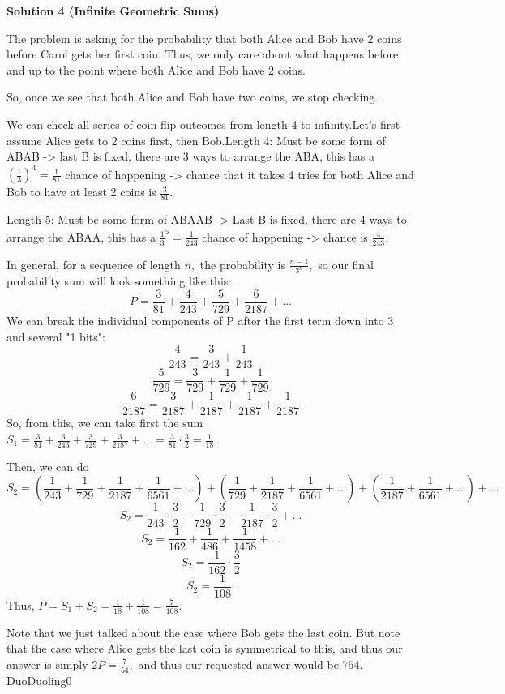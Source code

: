 \begin{enumerate}
 



\textbf{Solution 4 (Infinite Geometric Sums)}

The problem is asking for the probability that both Alice and Bob have 2 coins before Carol gets her first coin. Thus, we only care about what happens before and up to the point where both Alice and Bob have 2 coins.

 So, once we see that both Alice and Bob have two coins, we stop checking.

 We can check all series of coin flip outcomes from length 4 to infinity.Let's first assume Alice gets to 2 coins first, then Bob.Length 4: Must be some form of ABAB -> last B is fixed, there are 3 ways to arrange the ABA, this has a $\left(\frac{1}{3}\right)^4=\frac{1}{81}$ chance of happening -> chance that it takes 4 tries for both Alice and Bob to have at least 2 coins is $\frac{3}{81}.$

 Length 5: Must be some form of ABAAB -> Last B is fixed, there are 4 ways to arrange the ABAA, this has a $\frac{1}{3}^5 = \frac{1}{243}$ chance of happening -> chance is $\frac{4}{243}.$

 In general, for a sequence of length $n,$ the probability is $\frac{n-1}{3^n},$ so our final probability sum will look something like this:
 \[P = \frac{3}{81}+\frac{4}{243}+\frac{5}{729}+\frac{6}{2187}+...\]We can break the individual components of P after the first term down into 3 and several "1 bits":
 \[\frac{4}{243} = \frac{3}{243}+\frac{1}{243}\]
 \[\frac{5}{729} = \frac{3}{729}+\frac{1}{729}+\frac{1}{729}\]
 \[\frac{6}{2187} = \frac{3}{2187} + \frac{1}{2187} + \frac{1}{2187} + \frac{1}{2187}\]So, from this, we can take first the sum $S_1 = \frac{3}{81}+\frac{3}{243}+\frac{3}{729}+\frac{3}{2187}+... = \frac{3}{81}\cdot\frac{3}{2} = \frac{1}{18}.$

 Then, we can do
 \[S_2 =(\frac{1}{243}+\frac{1}{729}+\frac{1}{2187} + \frac{1}{6561}+...) + (\frac{1}{729}+\frac{1}{2187}+\frac{1}{6561}+...) + (\frac{1}{2187} + \frac{1}{6561}+...)+...\]
 \[S_2 = \frac{1}{243}\cdot\frac{3}{2} + \frac{1}{729}\cdot\frac{3}{2}+\frac{1}{2187}\cdot\frac{3}{2}+...\]
 \[S_2 = \frac{1}{162} + \frac{1}{486} + \frac{1}{1458} + ...\]
 \[S_2 = \frac{1}{162}\cdot\frac{3}{2}\]
 \[S_2 = \frac{1}{108}.\]Thus, $P = S_1+S_2 = \frac{1}{18} + \frac{1}{108} = \frac{7}{108}.$

 Note that we just talked about the case where Bob gets the last coin. But note that the case where Alice gets the last coin is symmetrical to this, and thus our answer is simply $2P = \frac{7}{54},$ and thus our requested answer would be $\boxed{754}.$-DuoDuoling0


\end{enumerate}
